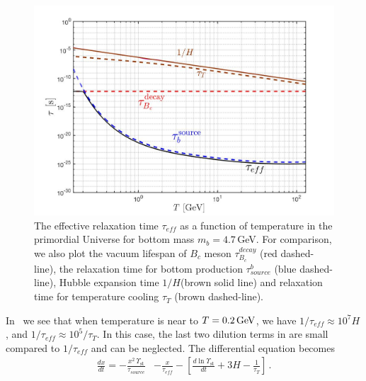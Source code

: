 \begin{figure} 
\centerline{\includegraphics[width=0.9\linewidth]{./plots/Tau_RelaxationTime002}}
\caption{The effective relaxation time $\tau_{eff}$ as a function of temperature in the primordial Universe for bottom mass $m_b=4.7$\,GeV. For comparison, we also plot the vacuum lifespan of $B_c$ meson $\tau_{B_c}^{decay}$ (red dashed-line), the relaxation time for bottom production $\tau^b_{source}$ (blue dashed-line), Hubble expansion time $1/H$(brown solid line) and relaxation time for temperature cooling $\tau_T$ (brown dashed-line). }
\label{RelaxationTime_eff}
\end{figure}

In~ we see that when temperature is near to $T=0.2\text{\,GeV}$, we have $1/\tau_{eff}\approx10^{7}H$, and $1/\tau_{eff}\approx10^5/\tau_T$. In this case, the last two dilution terms in   are small compared to $1/\tau_{eff}$ and can be neglected. The differential equation becomes
\begin{align}\label{nonstationary_eq}
\frac{dx}{dt}=-\frac{x^2\,\Upsilon_\mathrm{st}}{\tau_{source}}&-\frac{x}{\tau_{eff}}-\left[\frac{d\ln\Upsilon_\mathrm{st}}{dt}+3H-\frac{1}{\tau_T}\right]
\,.
\end{align}

